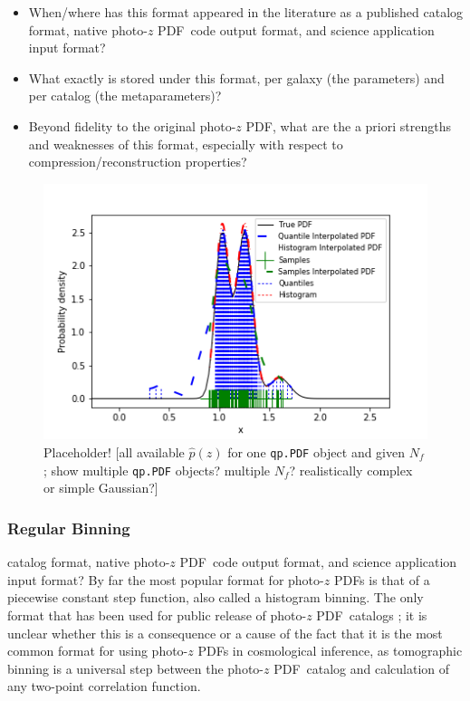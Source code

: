 \documentclass[\docopts]{\docclass}
\newcommand{\pz}{photo-$z$ PDF}
\begin{document}
\begin{itemize}
  \item When/where has this format appeared in the literature as a published 
catalog format, native \pz\ code output format, and science application input 
format?
  \item What exactly is stored under this format, per galaxy (the parameters) 
and per catalog (the metaparameters)?
  \item Beyond fidelity to the original \pz, what are the a priori strengths 
and weaknesses of this format, especially with respect to 
compression/reconstruction properties?
\end{itemize}

\begin{figure}
  \includegraphics[width=0.9\columnwidth]{figures/qp_placeholder.png}
  \caption{Placeholder! [all available $\hat{p}(z)$ for one \texttt{qp.PDF} 
object and given $N_{f}$; show multiple \texttt{qp.PDF} objects? multiple 
$N_{f}$? realistically complex or simple Gaussian?]
  \label{fig:qp}}
\end{figure}

\subsubsection{Regular Binning}
\label{sec:bins}

catalog format, native \pz\ code output format, and science application input 
format?
By far the most popular format for \pz s is that of a piecewise constant step 
function, also called a histogram binning.  The only format that has been used 
for public release of \pz\ catalogs \citep{tanaka_photometric_2017, 
sheldon_photometric_2012}; it is unclear whether this is a consequence or a 
cause of the fact that it is the most common format for using \pz s in 
cosmological inference, as tomographic binning is a universal step between the 
\pz\ catalog and calculation of any two-point correlation function.  
\end{document}
